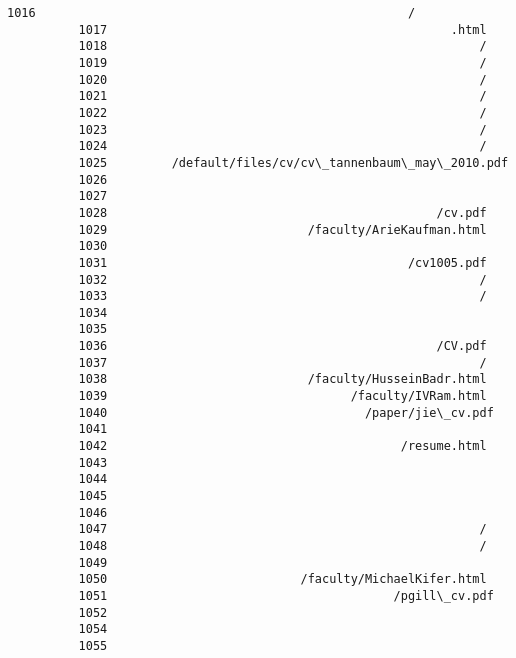 \documentclass[11pt]{article}
\begin{document}
\begin{Verbatim}[commandchars=\\\{\}]
          1016                                                    /
          1017                                                .html
          1018                                                    /
          1019                                                    /
          1020                                                    /
          1021                                                    /
          1022                                                    /
          1023                                                    /
          1024                                                    /
          1025         /default/files/cv/cv\_tannenbaum\_may\_2010.pdf
          1026                                                     
          1027                                                     
          1028                                              /cv.pdf
          1029                            /faculty/ArieKaufman.html
          1030                                                     
          1031                                          /cv1005.pdf
          1032                                                    /
          1033                                                    /
          1034                                                     
          1035                                                     
          1036                                              /CV.pdf
          1037                                                    /
          1038                            /faculty/HusseinBadr.html
          1039                                  /faculty/IVRam.html
          1040                                    /paper/jie\_cv.pdf
          1041                                                     
          1042                                         /resume.html
          1043                                                     
          1044                                                     
          1045                                                     
          1046                                                     
          1047                                                    /
          1048                                                    /
          1049                                                     
          1050                           /faculty/MichaelKifer.html
          1051                                        /pgill\_cv.pdf
          1052                                                     
          1054                                                     
          1055                                                     

\end{Verbatim}
\end{document}
